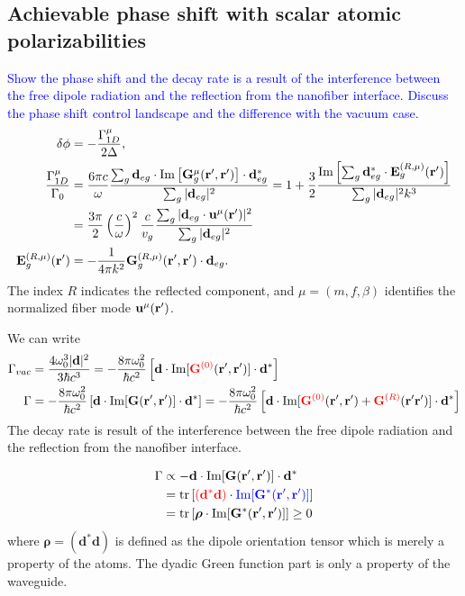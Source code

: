 \documentclass[preprint,aps,pra,onecolumn]{revtex4-1} %
\begin{document}
\subsection{Achievable phase shift with scalar atomic polarizabilities}

\textcolor{blue}{Show the phase shift and the decay rate is a result of the interference between the free dipole radiation and the reflection from the nanofiber interface. Discuss the phase shift control landscape and the difference with the vacuum case.}
\begin{align}
\delta\phi &= -\frac{\Gamma_{1D}^\mu}{2\Delta},\\
\frac{\Gamma_{1D}^\mu}{\Gamma_0} &= \frac{6\pi c}{\omega}\frac{\sum_g\mathbf{d}_{eg}\cdot \mathrm{Im}\left[\mathbf{G}_g^\mu(\mathbf{r}',\mathbf{r}') \right]\cdot\mathbf{d}_{eg}^* }{\sum_g|\mathbf{d}_{eg}|^2} = 1+ \frac{3}{2} \frac{\mathrm{Im}\left[\sum_g\mathbf{d}_{eg}^*\cdot \mathbf{E}^{(R,\mu)}_g(\mathbf{r}') \right]}{\sum_g|\mathbf{d}_{eg}|^2 k^3}\nonumber\\
&=\frac{3\pi}{2}\left(\frac{c}{\omega}\right)^2\frac{c}{v_g} \frac{\sum_{g}|\mathbf{d}_{eg}\cdot \mathbf{u}^\mu(\mathbf{r}')|^2}{\sum_g|\mathbf{d}_{eg}|^2}\\
\mathbf{E}^{(R,\mu)}_g(\mathbf{r}') &= -\frac{1}{4\pi k^2} \mathbf{G}^{(R,\mu)}_g(\mathbf{r}',\mathbf{r}')\cdot \mathbf{d}_{eg}.
\end{align}
The index $ R $ indicates the reflected component, and $\mu=(m,f,\beta)  $ identifies the normalized fiber mode $ \mathbf{u}^\mu(\mathbf{r}') $. 

We can write 
\begin{align}
\Gamma_{vac} &= \frac{4\omega_0^3|\mathbf{d}|^2}{3\hbar c^3}=-\frac{8\pi \omega_0^2}{\hbar c^2}\left[ \mathbf{d}\cdot \mathrm{Im}[\mathbin{\color{red}{\mathbf{G}^{(0)}}}(\mathbf{r}',\mathbf{r}')]\cdot \mathbf{d}^* \right]\\
\Gamma &= -\frac{8\pi \omega_0^2}{\hbar c^2}\left[ \mathbf{d}\cdot \mathrm{Im}[\mathbf{G}(\mathbf{r}',\mathbf{r}')]\cdot \mathbf{d}^* \right]=-\frac{8\pi \omega_0^2}{\hbar c^2}\left[ \mathbf{d}\cdot \mathrm{Im}[\mathbin{\color{red}{\mathbf{G}^{(0)}}}(\mathbf{r}',\mathbf{r}')+\mathbin{\color{red}{\mathbf{G}^{(R)}}}(\mathbf{r}'\mathbf{r}')]\cdot \mathbf{d}^* \right]\\
\end{align}
The decay rate is result of the interference between the free dipole radiation and the reflection from the nanofiber interface.

\begin{align}
\Gamma &\propto -\mathbf{d}\cdot \mathrm{Im}[\mathbf{G}(\mathbf{r}',\mathbf{r}')]\cdot \mathbf{d}^* \\
&=\mathrm{tr}\left[ \mathbin{\color{red}{(\mathbf{d}^*\mathbf{d})}}\cdot\mathbin{\color{blue}{ \mathrm{Im}[\mathbf{G}^*(\mathbf{r}',\mathbf{r}')]}}  \right]\\
&= \mathrm{tr}\left[ \boldsymbol{\rho} \cdot \mathrm{Im}[\mathbf{G}^{*}(\mathbf{r}',\mathbf{r}')]  \right]\ge 0
\end{align}
where $\boldsymbol{\rho}=(\mathbf{d}^*\mathbf{d})$ is defined as the dipole orientation tensor which is merely a property of the atoms. The dyadic Green function part is only a property of the waveguide.  
\end{document}
